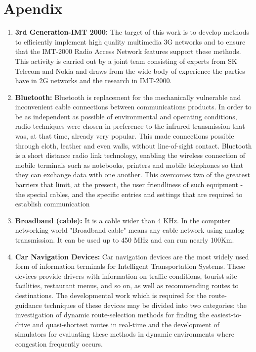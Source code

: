 \documentclass[12pt]{report}
\begin{document}
\chapter{Apendix}
\begin{enumerate}
\item {\bf 3rd Generation-IMT 2000:} The target of this work is to develop methods to efficiently implement high quality multimedia 3G networks and to ensure that the IMT-2000 Radio Access Network features support these methods. This activity is carried out by a joint team consisting of experts from SK Telecom and Nokia and draws from the wide body of experience the parties have in 2G networks and the research in IMT-2000.
\item {\bf Bluetooth:} Bluetooth is replacement for the mechanically vulnerable and inconvenient cable connections between communications products. In order to be as independent as possible of environmental and operating conditions, radio techniques were chosen in preference to the infrared transmission that was, at that time, already very popular. This made connections possible through cloth, leather and even walls, without line-of-sight contact. Bluetooth is a short distance radio link technology, enabling the wireless connection of mobile terminals such as notebooks, printers and mobile telephones so that they can exchange data with one another. This overcomes two of the greatest barriers that limit, at the present, the user friendliness of such equipment - the special cables, and the specific entries and settings that are required to establish communication
\item {\bf Broadband (cable):} It is a cable wider than 4 KHz. In the computer networking world "Broadband cable" means any cable network using analog transmission. It can be used up to 450 MHz and can run nearly 100Km.
\item {\bf Car Navigation Devices:} Car navigation devices are the most widely used form of information terminals for Intelligent Transportation Systems. These devices provide drivers with information on traffic conditions, tourist-site facilities, restaurant menus, and so on, as well as recommending routes to destinations. The developmental work which is required for the route-guidance techniques of these devices may be divided into two categories: the investigation of dynamic route-selection methods for finding the easiest-to-drive and quasi-shortest routes in real-time and the development of simulators for evaluating these methods in dynamic environments where congestion frequently occurs.

\end{enumerate}
\end{document}
